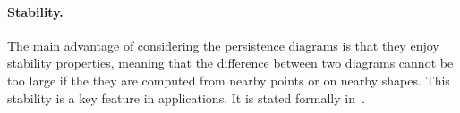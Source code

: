 \paragraph*{Stability.}
The main advantage of considering 
the persistence diagrams is that they enjoy stability properties, meaning that
the difference between two diagrams cannot be too large if the
they are computed from nearby points or on nearby shapes.  
This stability is a key feature in applications. It is stated formally in~\cite{Carriere15b}.






